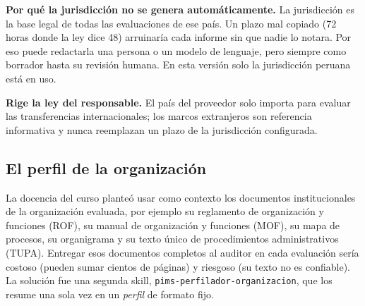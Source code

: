 \documentclass[12pt,letterpaper]{article}
\begin{document}
\par\noindent \textbf{Por qué la jurisdicción no se genera automáticamente.} La jurisdicción es la base legal de todas las evaluaciones de ese país. Un plazo mal copiado (72 horas donde la ley dice 48) arruinaría cada informe sin que nadie lo notara. Por eso puede redactarla una persona o un modelo de lenguaje, pero siempre como borrador hasta su revisión humana. En esta versión solo la jurisdicción peruana está en uso.
\par

\par\noindent \textbf{Rige la ley del responsable.} El país del proveedor solo importa para evaluar las transferencias internacionales; los marcos extranjeros son referencia informativa y nunca reemplazan un plazo de la jurisdicción configurada.
\par

\subsection{El perfil de la organización}
\label{sec:perfil}

La docencia del curso planteó usar como contexto los documentos institucionales de la organización evaluada, por ejemplo su reglamento de organización y funciones (ROF), su manual de organización y funciones (MOF), su mapa de procesos, su organigrama y su texto único de procedimientos administrativos (TUPA). Entregar esos documentos completos al auditor en cada evaluación sería costoso (pueden sumar cientos de páginas) y riesgoso (su texto no es confiable). La solución fue una segunda skill, \texttt{pims-perfilador-organizacion}, que los resume una sola vez en un \emph{perfil} de formato fijo.
\end{document}
